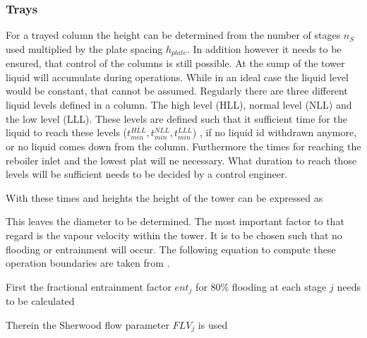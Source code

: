     \subsubsection{Trays}
        For a trayed column the height can be determined from the number of stages $n_S$ used multiplied by 
        the plate spacing $h_{plate}$. In addition however it needs to be ensured, that control of the 
        columns is still possible. At the sump of the tower liquid will accumulate during operations. 
        While in an ideal case the liquid level would be constant, that cannot be assumed. Regularly 
        there are three different liquid levels defined in a column. The high level (HLL), normal 
        level (NLL) and the low level (LLL). These levels are defined such that it sufficient time 
        for the liquid to reach these levels ($t_{min}^{HLL}, t_{min}^{NLL}, t_{min}^{LLL}$) , 
        if no liquid id withdrawn anymore, or no liquid comes down from the column. Furthermore 
        the times for reaching the reboiler inlet and the lowest plat will ne necessary. 
        What duration to reach those levels will be sufficient needs to be decided by a control engineer. 
        
        With these times and heights the height of the tower can be expressed as 
        
        This leaves the diameter to be determined. The most important factor to that regard is the vapour velocity 
        within the tower. It is to be chosen such that no flooding or entrainment will occur. The following equation 
        to compute these operation boundaries are taken from \cite{Lygeros.1986}. 
        
        First the fractional entrainment factor $ent_j$ for 80\% flooding at each stage $j$ needs to be calculated 
        
        Therein the Sherwood flow parameter $FLV_j$ is used
        
